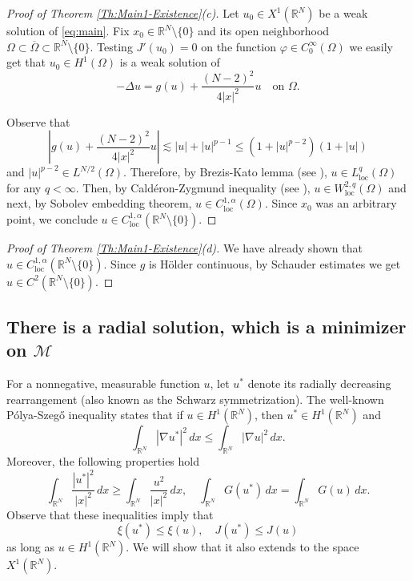 \documentclass[12pt,leqno,twoside,sort]{amsart}
\newcommand{\R}{\mathbb{R}}
\newcommand{\cM}{{\mathcal M}}
\numberwithin{equation}{section}
\newcommand{\loc}{\mathrm{loc}}
\begin{document}
\begin{proof}[Proof of Theorem \ref{Th:Main1-Existence}(c)]
Let $u_0\in X^1(\R^N)$ be a weak solution of \eqref{eq:main}. Fix $x_0\in\R^N\setminus\{0\}$ and its open neighborhood $\Omega\subset\overline{\Omega}\subset \R^N \setminus \{0\}$. Testing $J'(u_0)=0$ on the function $\varphi\in C_0^\infty(\Omega)$ we easily get that $u_0\in H^1(\Omega)$ is a weak solution of
\begin{equation}\label{E:C_2_temp}
    -\Delta u=g(u)+\frac{(N-2)^2}{4|x|^2} u \quad\text{on } \Omega.
\end{equation}

Observe that 
\[
\left|g(u)+\frac{(N-2)^2}{4|x|^2} u \right|\lesssim |u|+|u|^{p-1} \leq (1+|u|^{p-2})(1+|u|)
\]
and $|u|^{p-2}\in L^{N/2}(\Omega)$. Therefore, by Brezis-Kato lemma (see \cite[Lemma B.3]{Struwe}), $u\in L^q_{\loc}(\Omega)$ for any $q<\infty$. Then, by Cald\'{e}ron-Zygmund inequality (see \cite[Lemma B.2]{Struwe}), $u\in W^{2,q}_{\loc}(\Omega)$ and next, by Sobolev embedding theorem, $u\in C^{1,\alpha}_{\loc}(\Omega)$. Since $x_0$ was an arbitrary point, we conclude $u\in C^{1,\alpha}_{\loc}(\R^N\setminus\{0\})$.
\end{proof}

\begin{proof}[Proof of Theorem \ref{Th:Main1-Existence}(d)]
We have already shown that $u\in C^{1,\alpha}_{\loc}(\R^N \setminus \{0\})$. Since $g$ is H\"older continuous, by Schauder estimates we get $u\in C^{2}(\R^N \setminus \{0\})$.
\end{proof}


\subsection{There is a radial solution, which is a minimizer on \texorpdfstring{$\cM$}{M}}

For a nonnegative, measurable function $u$, let $u^*$ denote its radially decreasing rearrangement (also known as the Schwarz symmetrization). The well-known Pólya-Szegő inequality states that if $u \in H^1 (\R^N)$, then $u^* \in H^1 (\R^N)$ and
$$
\int_{\R^N} |\nabla u^*|^2 \, dx \leq \int_{\R^N} |\nabla u|^2 \, dx.
$$
Moreover, the following properties hold
$$
\int_{\R^N} \frac{|u^*|^2}{|x|^2} \, dx \geq \int_{\R^N} \frac{u^2}{|x|^2} \, dx, \quad \int_{\R^N} G(u^*) \, dx = \int_{\R^N} G(u) \, dx.
$$
Observe that these inequalities imply that
$$
\xi(u^*) \leq \xi(u), \quad J(u^*) \leq J(u)
$$
as long as $u \in H^1 (\R^N)$. We will show that it also extends to the space $X^1 (\R^N)$.
\end{document}
